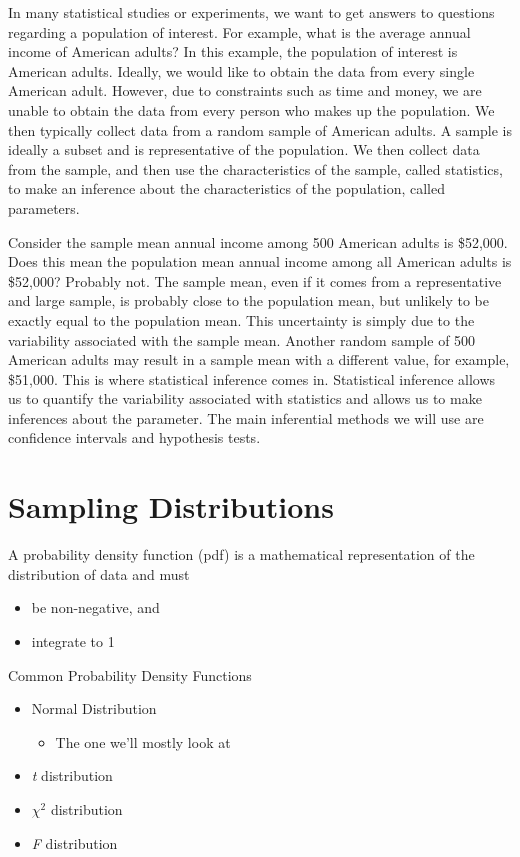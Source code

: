\documentclass[
  openany]{book}
\providecommand{\tightlist}{%
  \setlength{\itemsep}{0pt}\setlength{\parskip}{0pt}}
\begin{document}
In many statistical studies or experiments, we want to get answers to questions regarding a population of interest. For example, what is the average annual income of American adults? In this example, the population of interest is American adults. Ideally, we would like to obtain the data from every single American adult. However, due to constraints such as time and money, we are unable to obtain the data from every person who makes up the population. We then typically collect data from a random sample of American adults. A sample is ideally a subset and is representative of the population. We then collect data from the sample, and then use the characteristics of the sample, called statistics, to make an inference about the characteristics of the population, called parameters.

Consider the sample mean annual income among 500 American adults is \$52,000. Does this mean the population mean annual income among all American adults is \$52,000? Probably not. The sample mean, even if it comes from a representative and large sample, is probably close to the population mean, but unlikely to be exactly equal to the population mean. This uncertainty is simply due to the variability associated with the sample mean. Another random sample of 500 American adults may result in a sample mean with a different value, for example, \$51,000. This is where statistical inference comes in. Statistical inference allows us to quantify the variability associated with statistics and allows us to make inferences about the parameter. The main inferential methods we will use are confidence intervals and hypothesis tests.

\newpage

\section{Sampling Distributions}\label{sampling-distributions}

A probability density function (pdf) is a mathematical representation of the distribution of data and must

\begin{itemize}
\tightlist
\item
  be non-negative, and
\item
  integrate to 1
\end{itemize}

Common Probability Density Functions

\begin{itemize}
\tightlist
\item
  Normal Distribution

  \begin{itemize}
  \tightlist
  \item
    The one we'll mostly look at
  \end{itemize}
\item
  \emph{t} distribution
\item
  \(\chi^2\) distribution
\item
  \emph{F} distribution
\end{itemize}
\end{document}
